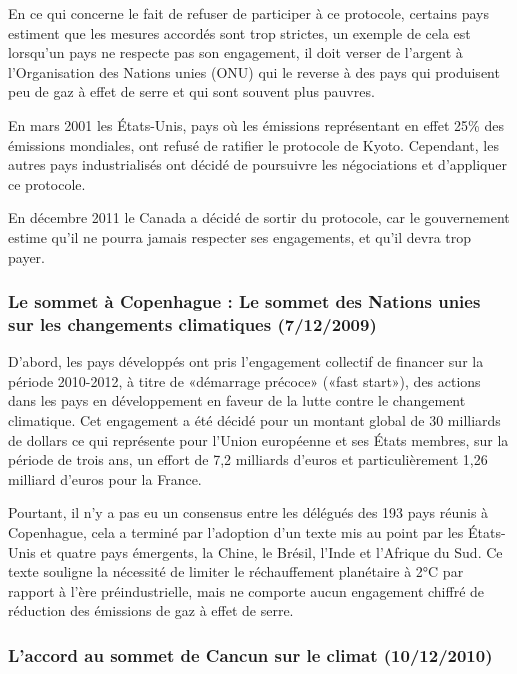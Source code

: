 \documentclass[a4paper,10pt]{article}
\begin{document}
En ce qui concerne  le fait de refuser de participer  à ce protocole, certains
pays estiment  que les mesures accordés  sont trop strictes, un  exemple de cela
est lorsqu’un pays ne respecte pas son engagement, il doit verser de l’argent à
l’Organisation des Nations unies (ONU) qui  le reverse à des pays qui produisent
peu de gaz à effet de serre et qui sont souvent plus pauvres.


En mars  2001 les États-Unis, pays  où les émissions représentant  en effet 25\%
des   émissions   mondiales,   ont   refusé   de  ratifier   le   protocole   de
Kyoto. Cependant,  les autres pays  industrialisés ont décidé de  poursuivre les
négociations et d'appliquer ce protocole.


En décembre  2011 le Canada  a décidé  de sortir du  protocole, car  le gouvernement
estime qu’il  ne pourra  jamais respecter ses engagements, et qu’il  devra trop
payer.


\subsubsection[Le sommet à Copenhague]{Le sommet à Copenhague : Le sommet des Nations unies sur les changements climatiques (7/12/2009)}

D’abord, les pays développés ont  pris l'engagement collectif de financer sur la
période 2010-2012,  à titre de  «démarrage précoce» («fast start»),  des actions
dans  les pays  en développement  en  faveur de  la lutte  contre le  changement
climatique. Cet engagement a été décidé pour un montant global de 30 milliards
de dollars ce  qui représente pour l'Union européenne et  ses États membres, sur
la période de trois ans, un effort de 7,2 milliards d'euros et particulièrement
1,26 milliard d'euros pour la France. 

Pourtant, il n’y a pas eu un  consensus entre les délégués des 193 pays réunis à
Copenhague,  cela a  terminé par  l’adoption  d’un texte  mis au  point par  les
États-Unis et quatre pays émergents, la Chine, le Brésil, l'Inde et l'Afrique du
Sud. Ce texte souligne la nécessité de limiter le réchauffement planétaire à 2°C
par rapport à  l’ère préindustrielle, mais ne comporte  aucun engagement chiffré
de réduction des émissions de gaz à effet de serre. 


\subsubsection[L’accord au sommet de Cancun sur le climat]{L’accord au sommet de Cancun sur le climat (10/12/2010)}
\end{document}
